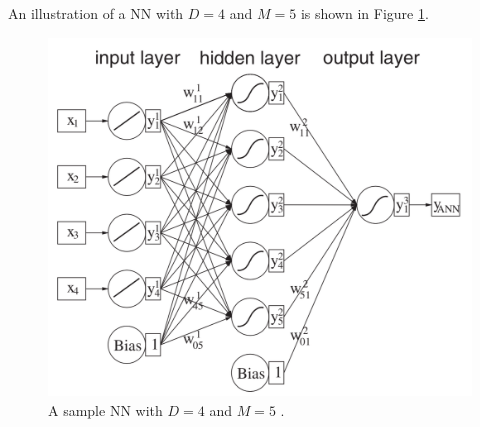 An illustration of a \gls{NN} with $D=4$ and $M=5$ is shown in Figure \ref{fig:nn}. 

\begin{figure}[!ht] 
    \centering
    \includegraphics[width=.7\textwidth]{appendices/images/neural_network.png}
    \caption[A sample \gls{NN} with $D=4$ and $M=5$]{A sample \gls{NN} with $D=4$ and $M=5$ \cite{data-analysis}.}
    \label{fig:nn}
\end{figure}

